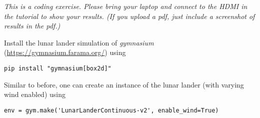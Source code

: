 

\emph{This is a coding exercise. Please bring your laptop and connect to the HDMI in the tutorial to show your results. (If you upload a pdf, just include a screenshot of results in the pdf.)}

Install the lunar lander simulation of \emph{gymnasium} (\url{https://gymnasium.farama.org/}) using
\begin{code}
\begin{Verbatim}[numbers=none,fontsize=\footnotesize]
pip install "gymnasium[box2d]"
\end{Verbatim}
\end{code}

Similar to before, one can create an instance of the lunar lander (with varying wind enabled) using
\begin{code}
\begin{Verbatim}[numbers=none,fontsize=\footnotesize]
env = gym.make('LunarLanderContinuous-v2', enable_wind=True)
\end{Verbatim}
\end{code}

